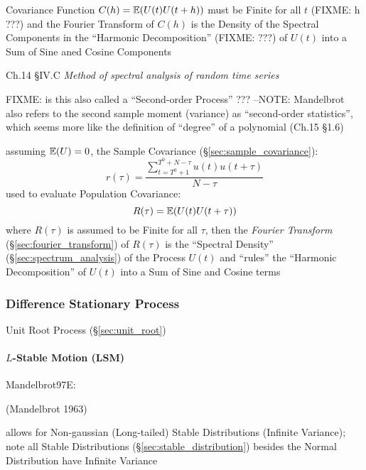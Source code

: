 Covariance Function $C(h) = \mathbb{E}(U(t) U(t + h))$ must be Finite for all $t$
(FIXME: h ???) and the Fourier Transform of $C(h)$ is the Density of the
Spectral Components in the ``Harmonic Decomposition'' (FIXME: ???) of $U(t)$
into a Sum of Sine aned Cosine Components

Ch.14 \S IV.C \emph{Method of spectral analysis of random time series}

FIXME: is this also called a ``Second-order Process'' ???
--NOTE: Mandelbrot also refers to the second sample moment (variance) as
``second-order statistics'', which seems more like the definition of ``degree''
of a polynomial (Ch.15 \S 1.6)

assuming $\mathbb{E}(U) = 0$, the Sample Covariance
(\S\ref{sec:sample_covariance}):
\[
  r(\tau) = \frac{\sum_{t = T^0 + 1}^{T^0 + N - \tau} u(t) u(t + \tau)}
    {N - \tau}
\]
used to evaluate Population Covariance:
\[
  R(\tau) = \mathbb{E}(U(t) U(t + \tau))
\]
where $R(\tau)$ is assumed to be Finite for all $\tau$, then the \emph{Fourier
Transform} (\S\ref{sec:fourier_transform}) of $R(\tau)$ is the ``Spectral
Density'' (\S\ref{sec:spectrum_analysis}) of the Process $U(t)$ and ``rules''
the ``Harmonic Decomposition'' of $U(t)$ into a Sum of Sine and Cosine terms



\subsubsection{Difference Stationary Process}\label{sec:difference_stationary}

Unit Root Process (\S\ref{sec:unit_root})



\paragraph{$L$-Stable Motion (LSM)}\label{sec:lsm}\hfill


Mandelbrot97E:

(Mandelbrot 1963)

allows for Non-gaussian (Long-tailed) Stable Distributions (Infinite Variance);
note all Stable Distributions (\S\ref{sec:stable_distribution}) besides the
Normal Distribution have Infinite Variance


